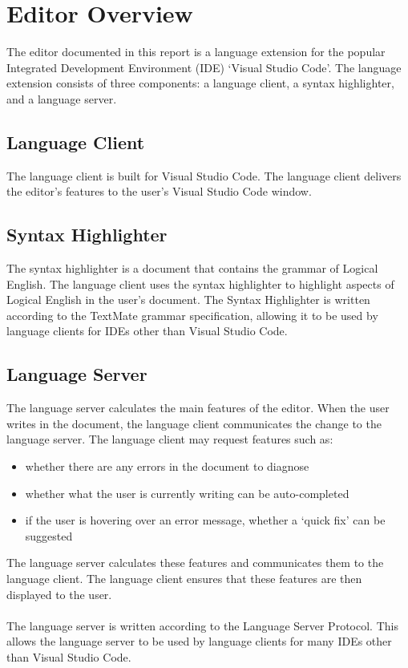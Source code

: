 \documentclass[../main.tex]{subfiles}
\begin{document}
\section{Editor Overview}
The editor documented in this report is a language extension for the popular Integrated Development Environment (IDE) `Visual Studio Code'. The language extension consists of three components: a language client, a syntax highlighter, and a language server. 

\subsection{Language Client}
The language client is built for Visual Studio Code. The language client delivers the editor's features to the user's Visual Studio Code window.

\subsection{Syntax Highlighter}
The syntax highlighter is a document that contains the grammar of Logical English. The language client uses the syntax highlighter to highlight aspects of Logical English in the user's document. The Syntax Highlighter is written according to the TextMate grammar specification, allowing it to be used by language clients for IDEs other than Visual Studio Code.

\subsection{Language Server}
The language server calculates the main features of the editor. When the user writes in the document, the language client communicates the change to the language server. The language client may request features such as:
\begin{itemize}
    \item whether there are any errors in the document to diagnose
    \item whether what the user is currently writing can be auto-completed
    \item if the user is hovering over an error message, whether a `quick fix' can be suggested
\end{itemize}
The language server calculates these features and communicates them to the language client. The language client ensures that these features are then displayed to the user. 
\\
\\
The language server is written according to the Language Server Protocol. This allows the language server to be used by language clients for many IDEs other than Visual Studio Code.
\end{document}
